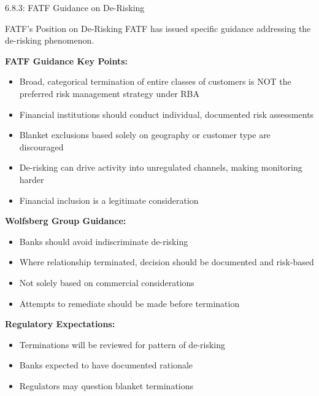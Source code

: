 \documentclass[11pt,a4paper]{beamer}
\begin{document}
\begin{frame}{6.8.3: FATF Guidance on De-Risking}
	\begin{block}{FATF's Position on De-Risking}
		FATF has issued specific guidance addressing the de-risking phenomenon.
	\end{block}
	\textbf{FATF Guidance Key Points:}
	\begin{itemize}
		\item Broad, categorical termination of entire classes of customers is NOT the preferred risk management strategy under RBA
		\item Financial institutions should conduct individual, documented risk assessments
		\item Blanket exclusions based solely on geography or customer type are discouraged
		\item De-risking can drive activity into unregulated channels, making monitoring harder
		\item Financial inclusion is a legitimate consideration
	\end{itemize}
	\textbf{Wolfsberg Group Guidance:}
	\begin{itemize}
		\item Banks should avoid indiscriminate de-risking
		\item Where relationship terminated, decision should be documented and risk-based
		\item Not solely based on commercial considerations
		\item Attempts to remediate should be made before termination
	\end{itemize}
	\textbf{Regulatory Expectations:}
	\begin{itemize}
		\item Terminations will be reviewed for pattern of de-risking
		\item Banks expected to have documented rationale
		\item Regulators may question blanket terminations
	\end{itemize}
\end{frame}

\end{document}
